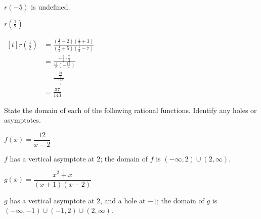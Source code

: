 \begin{exercises}
\begin{problem}
\begin{multicols}{4}
\begin{subproblem}
\begin{shortsolution}
 			$r(-5)$ is undefined.
 		\end{shortsolution}
 	\end{subproblem}
 	\begin{subproblem}
 		$r\left( \frac{1}{2} \right)$
 		\begin{shortsolution}
 			$\begin{aligned}[t]
 				r\left( \frac{1}{2} \right) & = \frac{\left( \frac{1}{2}-2 \right)\left( \frac{1}{2}+3 \right)}{\left( \frac{1}{2}+5 \right)\left( \frac{1}{2}-7 \right)} \\
 				                            & =\frac{-\frac{3}{2}\cdot\frac{7}{2}}{\frac{11}{2}\left( -\frac{13}{2} \right)}                                              \\
 				                            & =\frac{-\frac{21}{4}}{-\frac{143}{4}}                                                                                       \\
 				                            & =\frac{37}{143}                                                                                                             
 			\end{aligned}$
 		\end{shortsolution}
 	\end{subproblem}
 \end{multicols}
 \end{problem}
 \begin{problem}
 State the domain of each of the following rational functions. Identify
 any holes or asymptotes.
 \begin{multicols}{3}
 	\begin{subproblem}
 		$f(x)=\dfrac{12}{x-2}$ 
 		\begin{shortsolution}
 			$f$ has a vertical asymptote at $2$; the domain of $f$ is $(-\infty,2)\cup (2,\infty)$. 
 		\end{shortsolution}
 	\end{subproblem}
 	\begin{subproblem}
 		$g(x)=\dfrac{x^2+x}{(x+1)(x-2)}$ 
 		\begin{shortsolution}
 			$g$ has a vertical asymptote at $2$, and a hole at $-1$; the domain of $g$ is $(-\infty,-1)\cup(-1,2)\cup(2,\infty)$. 
 		\end{shortsolution}
 	\end{subproblem}
 	\begin{subproblem}

\end{subproblem}
\end{multicols}
\end{problem}
\end{exercises}
